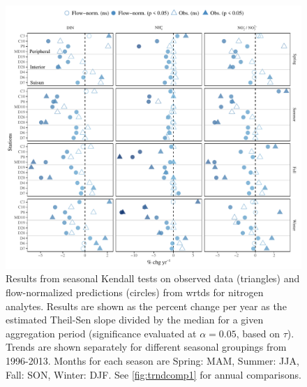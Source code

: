\documentclass[letterpaper,12pt,oneside]{article}\usepackage[]{graphicx}\usepackage[]{color}
\begin{document}
\begin{figure}
\centering
\includegraphics[width=1\textwidth,page=1]{figs/trndcomp3.pdf}
\caption{Results from seasonal Kendall tests on observed data (triangles) and flow-normalized predictions (circles) from \ac{wrtds} for nitrogen analytes. Results are shown as the percent change per year as the estimated Theil-Sen slope divided by the median for a given aggregation period (significance evaluated at $\alpha = 0.05$, based on $\tau$). Trends are shown separately for different seasonal groupings from 1996-2013. Months for each season are Spring: MAM, Summer: JJA, Fall: SON, Winter: DJF. See \cref{fig:trndcomp1} for annual comparisons.}
\label{fig:trndcomp3}   
\end{figure}

\clearpage
\end{document}
